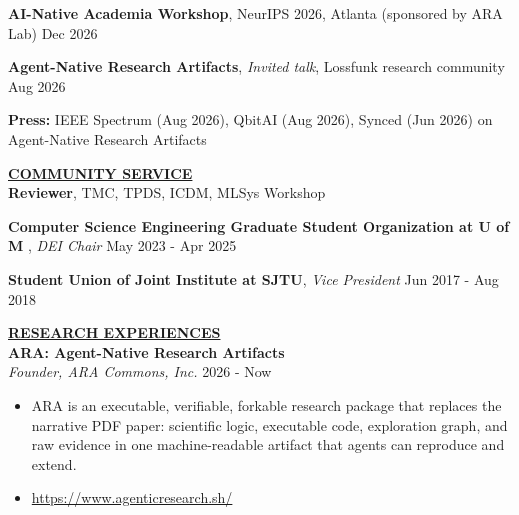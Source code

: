 \documentclass{article}
\begin{document}
\noindent \textbf{AI-Native Academia Workshop}, NeurIPS 2026, Atlanta (sponsored by ARA Lab) \hfill Dec 2026

\noindent \textbf{Agent-Native Research Artifacts}, \textit{Invited talk}, Lossfunk research community \hfill Aug 2026

\noindent \textbf{Press:} IEEE Spectrum (Aug 2026), QbitAI (Aug 2026), Synced (Jun 2026) on Agent-Native Research Artifacts


\noindent \textbf{\underline{COMMUNITY SERVICE}} \\
\noindent \textbf{Reviewer}, TMC, TPDS, ICDM, MLSys Workshop

\noindent \textbf{Computer Science Engineering Graduate Student Organization at U of M }, \textit{DEI Chair}  \hfill May 2023 - Apr 2025


\noindent \textbf{Student Union of Joint Institute at SJTU}, \textit{Vice President} \hfill Jun 2017 - Aug 2018 




\noindent \textbf{\underline{RESEARCH EXPERIENCES}} 
\\
\noindent 
\textbf{ARA: Agent-Native Research Artifacts}\\
\quad \textit{Founder, ARA Commons, Inc.} \hfill 2026 - Now
\begin{itemize}[noitemsep,nolistsep,leftmargin=*]
\item ARA is an executable, verifiable, forkable research package that replaces the narrative PDF paper: scientific logic, executable code, exploration graph, and raw evidence in one machine-readable artifact that agents can reproduce and extend.
\item \url{https://www.agenticresearch.sh/}
\end{itemize}
\end{document}
